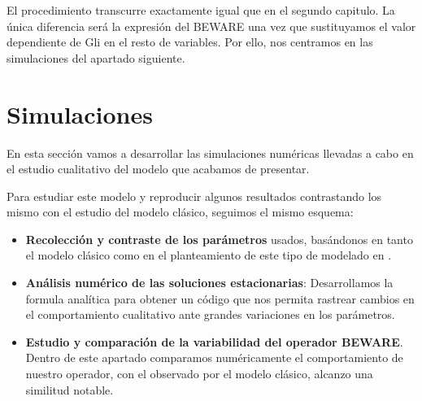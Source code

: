 El procedimiento transcurre exactamente igual que en el segundo capitulo. La única diferencia será la expresión del BEWARE una vez que sustituyamos el valor dependiente de Gli en el resto de variables. Por ello, nos centramos en las simulaciones del apartado siguiente.


\section{Simulaciones}
En esta sección vamos a desarrollar las simulaciones numéricas llevadas a cabo en el estudio cualitativo del modelo que acabamos de presentar.

Para estudiar este modelo y reproducir algunos resultados contrastando los mismo con el estudio del modelo clásico, seguimos el mismo esquema:
\begin{itemize}
	\item \textbf{Recolección y contraste de los parámetros} usados, basándonos en tanto el modelo clásico como en el planteamiento de este tipo de modelado en \cite{cambon1}. 
	\item \textbf{Análisis numérico de las soluciones estacionarias}: Desarrollamos la formula analítica para obtener un código que nos permita rastrear cambios en el comportamiento cualitativo ante grandes variaciones en los parámetros.
	\item \textbf{Estudio y comparación de la variabilidad del operador BEWARE}. Dentro de este apartado comparamos numéricamente el comportamiento de nuestro operador, con el observado por el modelo clásico, alcanzo una similitud notable.

\end{itemize}
